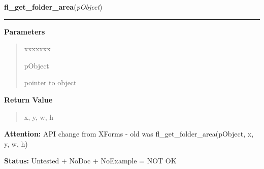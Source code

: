 \hspace{.8\funcindent}\begin{boxedminipage}{\funcwidth}

    \raggedright \textbf{fl\_get\_folder\_area}(\textit{pObject})

    \vspace{-1.5ex}

    \rule{\textwidth}{0.5\fboxrule}
\setlength{\parskip}{2ex}
\setlength{\parskip}{1ex}
      \textbf{Parameters}
      \vspace{-1ex}

      \begin{quote}
        \begin{Ventry}{xxxxxxx}

          \item[pObject]

          pointer to object

        \end{Ventry}

      \end{quote}

      \textbf{Return Value}
    \vspace{-1ex}

      \begin{quote}
      x, y, w, h

      \end{quote}

\textbf{Attention:} API change from XForms - old was fl\_get\_folder\_area(pObject, x, y, w, h)



\textbf{Status:} Untested + NoDoc + NoExample = NOT OK



    \end{boxedminipage}

    \label{xformslib:library:fl_replace_folder_bynumber}

    \vspace{0.5ex}

